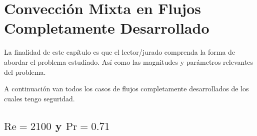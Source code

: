 \chapter{Convección Mixta en Flujos Completamente Desarrollado}


La finalidad de este capítulo es que el lector/jurado comprenda la forma de abordar el problema estudiado. Así como las magnitudes y parámetros relevantes del problema. 


\newpage

A continuación van todos los casos de flujos completamente desarrollados de los cuales tengo seguridad.


\section{$\text{Re}=2100$ y $\text{Pr}=0.71$}

\begin{figure}[H]
  \centering
  \caption{}
  \label{fig:phi-Re2100-Pr071}
\end{figure}

